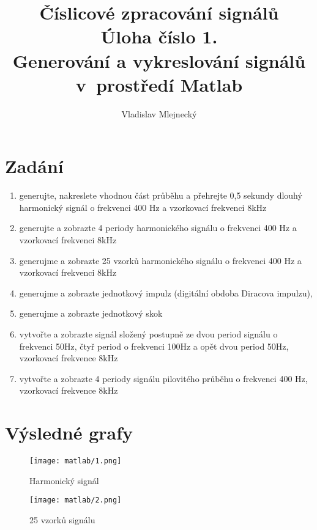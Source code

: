 \documentclass[11pt, a4paper]{article}
\author{Vladislav Mlejnecký}
\title{%
  Číslicové zpracování signálů\\
  \large Úloha číslo 1.\\
  Generování a vykreslování signálů v prostředí Matlab}
\begin{document}
    \maketitle
    

    \section{Zadání}
        \begin{enumerate}
            \item
            generujte, nakreslete vhodnou část průběhu a přehrejte 0,5 sekundy dlouhý harmonický signál o frekvenci 400 Hz a vzorkovací frekvenci 8kHz
            \item
            generujte a zobrazte  4 periody harmonického signálu o frekvenci 400 Hz a vzorkovací frekvenci 8kHz
            \item
            generujme a zobrazte 25 vzorků harmonického signálu o frekvenci 400 Hz a vzorkovací frekvenci 8kHz
            \item
            generujme a zobrazte jednotkový impulz  (digitální obdoba Diracova impulzu), 
            \item
            generujme a zobrazte jednotkový skok
            \item
            vytvořte a zobrazte signál složený postupně ze dvou period signálu o frekvenci 50Hz, čtyř period o frekvenci 100Hz a opět dvou period 50Hz, vzorkovací frekvence 8kHz
            \item
            vytvořte a zobrazte 4 periody signálu pilovitého průběhu o frekvenci 400 Hz, vzorkovací frekvence 8kHz
        \end{enumerate}
    
    \section{Výsledné grafy}
    
        \begin{figure}[H]
            \centering
            \begin{minipage}{.5\textwidth}
                \centering
                \texttt{[image: matlab/1.png]}
                \caption{Harmonický signál}
                \label{fig:graf1}
            \end{minipage}%
            \begin{minipage}{.5\textwidth}
                \centering
                \texttt{[image: matlab/2.png]}
                \caption{25 vzorků signálu}
            \label{fig:graf3}
            \end{minipage}
        \end{figure}
\end{document}
